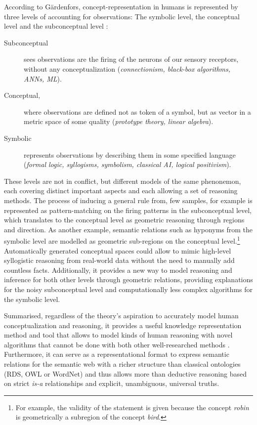 
According to Gärdenfors, concept-representation in humans is represented by three levels of accounting for observations: The symbolic level, the conceptual level and the subconceptual level \cite[204]{Gardenfors2000a}:
\begin{description}
    \item[Subconceptual] sees observations are the firing of the neurons of our sensory receptors, without any conceptualization (\textit{connectionism, black-box algorithms, ANNs, ML}).
    \item[Conceptual,] where observations are defined not as token of a symbol, but as vector in a metric space of some quality (\textit{prototype theory, linear algebra}).
    \item[Symbolic] represents observations by describing them in some specified language (\textit{formal logic, syllogisms, symbolism, classical AI, logical positivism}).
\end{description}

These levels are not in conflict, but different models of the same phenonemon, each covering distinct important aspects and each allowing a set of reasoning methods. The process of inducing a general rule from, few samples, for example is represented as pattern-matching on the firing patterns in the subconceptual level, which translates to the conceptual level as geometric reasoning through regions and direction. As another example, semantic relations such as hyponyms from the symbolic level are modelled as geometric sub-regions on the conceptual level.\footnote{For example, the validity of the statement \textit{} is given because the concept \textit{robin} is geometrically a subregion of the concept \textit{bird}.} Automatically generated conceptual spaces could allow to mimic high-level syllogistic reasoning from real-world data without the need to manually add countless facts. Additionally, it provides a new way to model reasoning and inference for both other levels through geometric relations, providing explanations for the noisy subconceptual level and computationally less complex algorithms for the symbolic level. 

Summarised, regardless of the theory's aspiration to accurately model human conceptualization and reasoning, it provides a useful knowledge representation method and tool that allows to model kinds of human reasoning with novel algorithms that cannot be done with both other well-researched methods \cite[Sec.~6.7]{Gardenfors2000a}. Furthermore, it can serve as a representational format to express semantic relations for the semantic web \cite{Gardenfors2004} with a richer structure than classical ontologies (\eg RDS, OWL or WordNet) and thus allows more than deductive reasoning based on strict \textit{is-a} relationships and explicit, unambiguous, universal truths.


